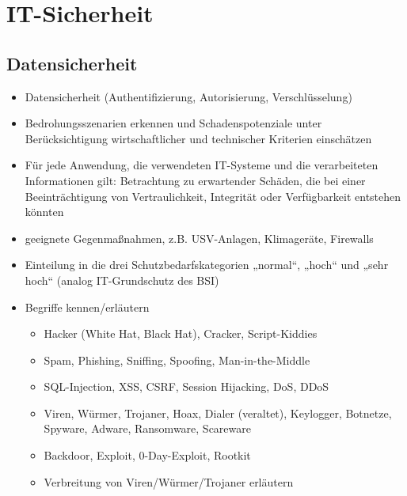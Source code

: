 \section{IT-Sicherheit}
\label{sec:IT-Sicherheit}

\subsection{Datensicherheit}
\label{sec:Datensicherheit}




\begin{itemize}
	\item Datensicherheit (Authentifizierung, Autorisierung, Verschlüsselung)
	\item Bedrohungsszenarien erkennen und Schadenspotenziale unter Berücksichtigung wirtschaftlicher und technischer Kriterien einschätzen
	\item Für jede Anwendung, die verwendeten IT-Systeme und die verarbeiteten Informationen gilt: Betrachtung zu erwartender Schäden, die bei einer Beeinträchtigung von Vertraulichkeit, Integrität oder Verfügbarkeit entstehen könnten
	\item geeignete Gegenmaßnahmen, z.B. USV-Anlagen, Klimageräte, Firewalls
	\item Einteilung in die drei Schutzbedarfskategorien „normal“, „hoch“ und „sehr hoch“ (analog IT-Grundschutz des BSI)
	\item Begriffe kennen/erläutern
	\begin{itemize}
		\item Hacker (White Hat, Black Hat), Cracker, Script-Kiddies
		\item Spam, Phishing, Sniffing, Spoofing, Man-in-the-Middle
		\item SQL-Injection, XSS, CSRF, Session Hijacking, DoS, DDoS
		\item Viren, Würmer, Trojaner, Hoax, Dialer (veraltet), Keylogger, Botnetze, Spyware, Adware, Ransomware, Scareware
		\item Backdoor, Exploit, 0-Day-Exploit, Rootkit
		\item Verbreitung von Viren/Würmer/Trojaner erläutern
	\end{itemize}
	
\end{itemize}